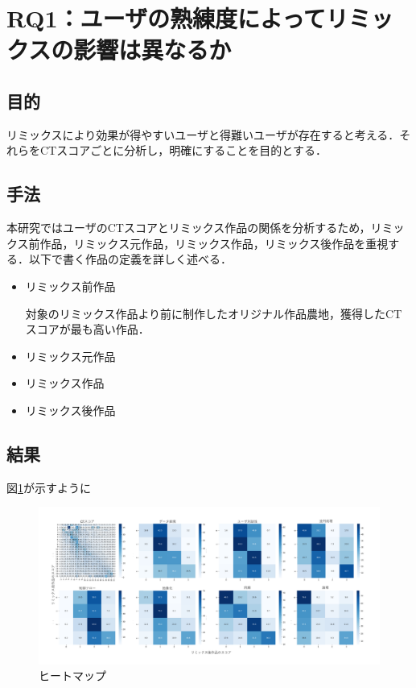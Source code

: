 \documentclass[submit,techrep,noauthor]{ipsj}
\begin{document}
\section{RQ1：ユーザの熟練度によってリミックスの影響は異なるか}
\subsection{目的}
リミックスにより効果が得やすいユーザと得難いユーザが存在すると考える．それらをCTスコアごとに分析し，明確にすることを目的とする．

\subsection{手法}
本研究ではユーザのCTスコアとリミックス作品の関係を分析するため，リミックス前作品，リミックス元作品，リミックス作品，リミックス後作品を重視する．以下で書く作品の定義を詳しく述べる．

\begin{itemize}
    \item リミックス前作品
    
    対象のリミックス作品より前に制作したオリジナル作品農地，獲得したCTスコアが最も高い作品．
    
    \item リミックス元作品

    
    
    \item リミックス作品
    \item リミックス後作品
\end{itemize}

\subsection{結果}
図\ref{heatmap}が示すように

\begin{figure}[t]
  \centering
  \includegraphics[width=\textwidth]{@IPSJ_SIGSE202511_Horio/heatmap.pdf}
  \caption{ヒートマップ}
  \label{heatmap}
\end{figure}
\end{document}

